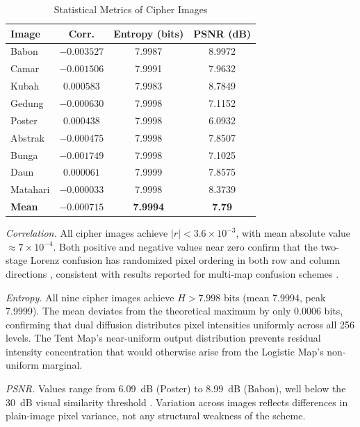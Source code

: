 \documentclass[conference]{IEEEtran}
\begin{document}
\begin{table}[htbp]
	\caption{Statistical Metrics of Cipher Images}
	\label{tab:metrics}
	\begin{center}
		\begin{tabular}{|l|c|c|c|}
			\hline
			\textbf{Image} & \textbf{Corr.} & \textbf{Entropy (bits)} & \textbf{PSNR (dB)} \\
			\hline
			Babon    & $-0.003527$ & 7.9987 & 8.9972 \\
			Camar    & $-0.001506$ & 7.9991 & 7.9632 \\
			Kubah    &  $0.000583$ & 7.9983 & 8.7849 \\
			Gedung   & $-0.000630$ & 7.9998 & 7.1152 \\
			Poster   &  $0.000438$ & 7.9998 & 6.0932 \\
			Abstrak  & $-0.000475$ & 7.9998 & 7.8507 \\
			Bunga    & $-0.001749$ & 7.9998 & 7.1025 \\
			Daun     &  $0.000061$ & 7.9999 & 7.8575 \\
			Matahari & $-0.000033$ & 7.9998 & 8.3739 \\
			\hline
			\textbf{Mean} & $\mathbf{-0.000715}$ & \textbf{7.9994} & \textbf{7.79} \\
			\hline
		\end{tabular}
	\end{center}
\end{table}

\textit{Correlation.} All cipher images achieve $|r| < 3.6\!\times\!10^{-3}$, with mean absolute value $\approx 7\!\times\!10^{-4}$. Both positive and negative values near zero confirm that the two-stage Lorenz confusion has randomized pixel ordering in both row and column directions \cite{b29}, consistent with results reported for multi-map confusion schemes \cite{b22,b26}.

\textit{Entropy.} All nine cipher images achieve $H > 7.998$ bits (mean 7.9994, peak 7.9999). The mean deviates from the theoretical maximum by only 0.0006 bits, confirming that dual diffusion distributes pixel intensities uniformly across all 256 levels. The Tent Map's near-uniform output distribution \cite{b25} prevents residual intensity concentration that would otherwise arise from the Logistic Map's non-uniform marginal.

\textit{PSNR.} Values range from 6.09~dB (Poster) to 8.99~dB (Babon), well below the 30~dB visual similarity threshold \cite{b12}. Variation across images reflects differences in plain-image pixel variance, not any structural weakness of the scheme.
\end{document}
